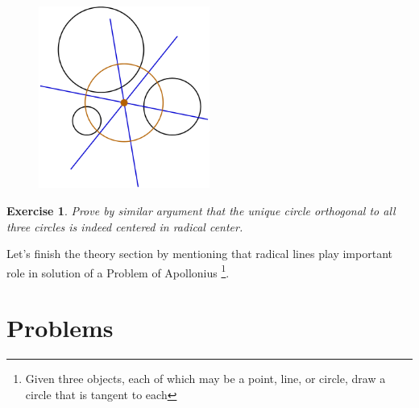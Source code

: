 \documentclass[11pt,a5paper]{article}
\newtheorem{exercise}{Exercise}
\begin{document}
\begin{figure}[h] \begin{center}
\includegraphics[width=0.5\textwidth]{center}
\end{center} \end{figure}


\begin{exercise}
Prove by similar argument that the unique circle orthogonal to all three circles is indeed centered in radical center.
\end{exercise}

\noindent Let's finish the theory section by mentioning that radical lines play important role in solution of a Problem of Apollonius \footnote{Given three objects, each of which may be a point, line, or circle, draw a circle that is tangent to each}.

\section{Problems}
\end{document}
